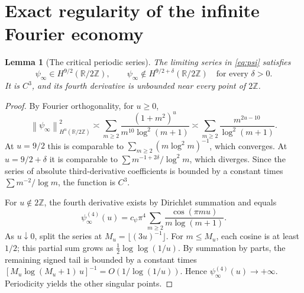 \documentclass[11pt,a4paper]{article}
\newtheorem{lemma}[theorem]{Lemma}
\theoremstyle{remark}
\newcommand{\R}{\mathbb R}
\newcommand{\norm}[1]{\left\lVert#1\right\rVert}
\begin{document}
\section{Exact regularity of the infinite Fourier economy}
\begin{lemma}[The critical periodic series]\label{lem:psi}
The limiting series in \eqref{eq:psi} satisfies
\begin{equation}\label{eq:critical}
 \psi_\infty\in H^{9/2}(\R/2\mathbb Z),\qquad
 \psi_\infty\notin H^{9/2+\delta}(\R/2\mathbb Z)
 \quad\text{for every }\delta>0.
\end{equation}
It is $C^3$, and its fourth derivative is unbounded near every point of $2\mathbb Z$.
\end{lemma}
\begin{proof}
By Fourier orthogonality, for $u\ge0$,
\begin{equation}
 \norm{\psi_\infty}_{H^u(\R/2\mathbb Z)}^2
 \asymp \sum_{m\ge2}\frac{(1+m^2)^u}{m^{10}\log^2(m+1)}
 \asymp\sum_{m\ge2}\frac{m^{2u-10}}{\log^2(m+1)}.
\end{equation}
At $u=9/2$ this is comparable to $\sum_{m\ge2}(m\log^2m)^{-1}$, which converges. At $u=9/2+\delta$ it is comparable to $\sum m^{-1+2\delta}/\log^2m$, which diverges. Since the series of absolute third-derivative coefficients is bounded by a constant times $\sum m^{-2}/\log m$, the function is $C^3$.

For $u\notin2\mathbb Z$, the fourth derivative exists by Dirichlet summation and equals
\begin{equation}
 \psi_\infty^{(4)}(u)=c_\psi\pi^4
 \sum_{m\ge2}\frac{\cos(\pi m u)}{m\log(m+1)}.
\end{equation}
As $u\downarrow0$, split the series at $M_u=\lfloor(3u)^{-1}\rfloor$. For $m\le M_u$, each cosine is at least $1/2$; this partial sum grows as $\tfrac12\log\log(1/u)$. By summation by parts, the remaining signed tail is bounded by a constant times $[M_u\log(M_u+1)\,u]^{-1}=O(1/\log(1/u))$. Hence $\psi_\infty^{(4)}(u)\to+\infty$. Periodicity yields the other singular points.
\end{proof}
\end{document}
